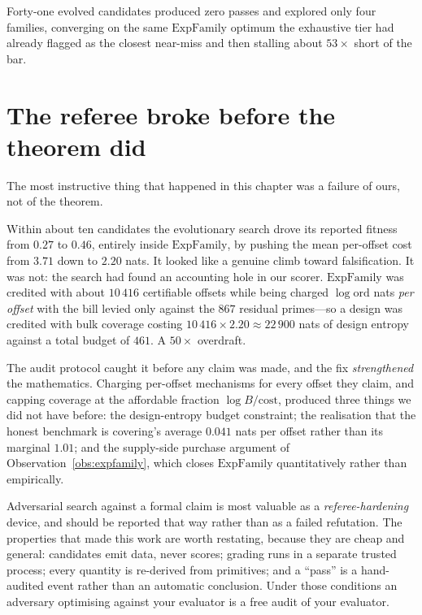 Forty-one evolved candidates produced zero passes and explored only four
families, converging on the same $\mathrm{ExpFamily}$ optimum the exhaustive
tier had already flagged as the closest near-miss and then stalling about
$53\times$ short of the bar.

\section{The referee broke before the theorem did}\label{sec:referee}

The most instructive thing that happened in this chapter was a failure of ours,
not of the theorem.

Within about ten candidates the evolutionary search drove its reported fitness
from $0.27$ to $0.46$, entirely inside $\mathrm{ExpFamily}$, by pushing the mean
per-offset cost from $3.71$ down to $2.20$ nats. It looked like a genuine climb
toward falsification. It was not: the search had found an accounting hole in our
scorer. $\mathrm{ExpFamily}$ was credited with about $10\,416$ certifiable
offsets while being charged $\log\mathrm{ord}$ nats \emph{per offset} with the
bill levied only against the $867$ residual primes---so a design was credited
with bulk coverage costing $10\,416\times2.20\approx22\,900$ nats of design
entropy against a total budget of $461$. A $50\times$ overdraft.

The audit protocol caught it before any claim was made, and the fix
\emph{strengthened} the mathematics. Charging per-offset mechanisms for every
offset they claim, and capping coverage at the affordable fraction
$\log B/\mathrm{cost}$, produced three things we did not have before: the
design-entropy budget constraint; the realisation that the honest benchmark is
covering's average $0.041$ nats per offset rather than its marginal $1.01$; and
the supply-side purchase argument of Observation~\ref{obs:expfamily}, which
closes $\mathrm{ExpFamily}$ quantitatively rather than empirically.

\begin{remark}\label{rem:referee}
Adversarial search against a formal claim is most valuable as a
\emph{referee-hardening} device, and should be reported that way rather than as
a failed refutation. The properties that made this work are worth restating,
because they are cheap and general: candidates emit data, never scores; grading
runs in a separate trusted process; every quantity is re-derived from
primitives; and a ``pass'' is a hand-audited event rather than an automatic
conclusion. Under those conditions an adversary optimising against your
evaluator is a free audit of your evaluator.
\end{remark}


